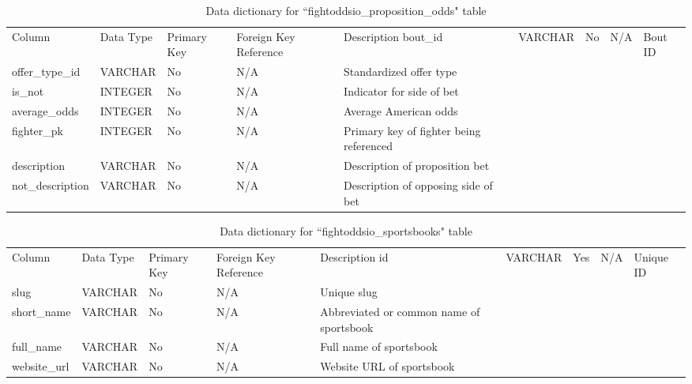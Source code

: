 \documentclass[12pt,twoside]{report}
\begin{document}
\tiny 
\begin{longtable}{lllll}
\caption{Data dictionary for ``fightoddsio\_proposition\_odds" table}\\ 
\toprule
Column           & Data Type & Primary Key & Foreign Key Reference & Description                              \endfirsthead 
\toprule
bout\_id         & VARCHAR   & No          & N/A                   & Bout ID                                  \\
offer\_type\_id  & VARCHAR   & No          & N/A                   & Standardized offer type                  \\
is\_not          & INTEGER   & No          & N/A                   & Indicator for side of bet                \\
average\_odds    & INTEGER   & No          & N/A                   & Average American odds                    \\
fighter\_pk      & INTEGER   & No          & N/A                   & Primary key of fighter being referenced  \\
description      & VARCHAR   & No          & N/A                   & Description of proposition bet           \\
not\_description & VARCHAR   & No          & N/A                   & Description of opposing side of bet      \\
\bottomrule
\end{longtable}
\normalsize

\tiny 
\begin{longtable}{lllll}
\caption{Data dictionary for ``fightoddsio\_sportsbooks" table}\\ 
\toprule
Column       & Data Type & Primary Key & Foreign Key Reference & Description                               \endfirsthead 
\toprule
id           & VARCHAR   & Yes         & N/A                   & Unique ID                                 \\
slug         & VARCHAR   & No          & N/A                   & Unique slug                               \\
short\_name  & VARCHAR   & No          & N/A                   & Abbreviated or common name of sportsbook  \\
full\_name   & VARCHAR   & No          & N/A                   & Full name of sportsbook                   \\
website\_url & VARCHAR   & No          & N/A                   & Website URL of sportsbook                 \\
\bottomrule
\end{longtable}
\normalsize
\end{document}
